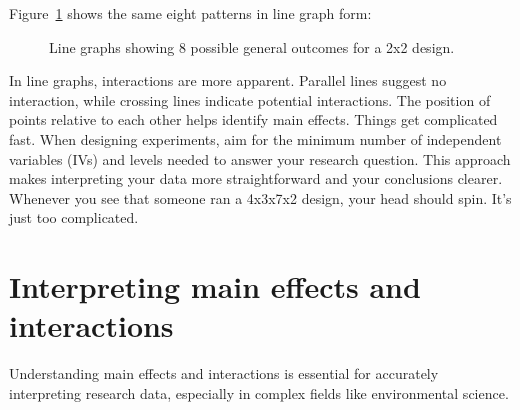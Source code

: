 \documentclass[
  letterpaper,
  DIV=11,
  numbers=noendperiod]{scrreprt}
\begin{document}
Figure~\ref{fig-11lines22} shows the same eight patterns in line graph
form:

\begin{figure}


\caption{\label{fig-11lines22}Line graphs showing 8 possible general
outcomes for a 2x2 design.}

\end{figure}%

In line graphs, interactions are more apparent. Parallel lines suggest
no interaction, while crossing lines indicate potential interactions.
The position of points relative to each other helps identify main
effects. Things get complicated fast. When designing experiments, aim
for the minimum number of independent variables (IVs) and levels needed
to answer your research question. This approach makes interpreting your
data more straightforward and your conclusions clearer. Whenever you see
that someone ran a 4x3x7x2 design, your head should spin. It's just too
complicated.

\section{Interpreting main effects and
interactions}\label{interpreting-main-effects-and-interactions}

Understanding main effects and interactions is essential for accurately
interpreting research data, especially in complex fields like
environmental science.
\end{document}
